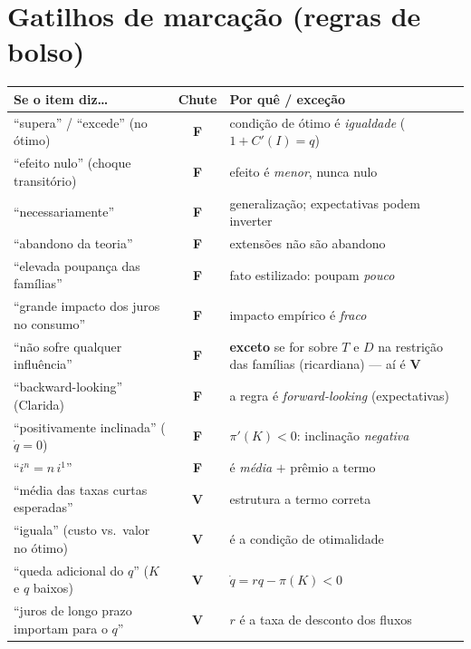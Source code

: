 \documentclass[12pt, a4paper]{article}
\newcommand{\Vok}{\textbf{\textcolor{greenbox}{V}}}
\newcommand{\Fno}{\textbf{\textcolor{redf}{F}}}
\begin{document}
\section{Gatilhos de marcação (regras de bolso)}

\begin{resultbox}[title={Palavra no item $\Rightarrow$ chute educado (e a exceção)}]
\renewcommand{\arraystretch}{1.25}
\begin{tabular}{p{4.6cm} c p{8.6cm}}
\toprule
\textbf{Se o item diz\ldots} & \textbf{Chute} & \textbf{Por quê / exceção} \\
\midrule
``supera'' / ``excede'' (no ótimo) & \Fno & condição de ótimo é
\emph{igualdade} ($1{+}C'(I){=}q$) \\
``efeito nulo'' (choque transitório) & \Fno & efeito é \emph{menor}, nunca
nulo \\
``necessariamente'' & \Fno & generalização; expectativas podem inverter \\
``abandono da teoria'' & \Fno & extensões não são abandono \\
``elevada poupança das famílias'' & \Fno & fato estilizado: poupam
\emph{pouco} \\
``grande impacto dos juros no consumo'' & \Fno & impacto empírico é
\emph{fraco} \\
``não sofre qualquer influência'' & \Fno & \textbf{exceto} se for sobre $T$ e
$D$ na restrição das famílias (ricardiana) --- aí é \Vok \\
``backward-looking'' (Clarida) & \Fno & a regra é \emph{forward-looking}
(expectativas) \\
``positivamente inclinada'' ($\dot q=0$) & \Fno & $\pi'(K)<0$: inclinação
\emph{negativa} \\
``$i^n = n\,i^1$'' & \Fno & é \emph{média} $+$ prêmio a termo \\
``média das taxas curtas esperadas'' & \Vok & estrutura a termo correta \\
``iguala'' (custo vs.\ valor no ótimo) & \Vok & é a condição de otimalidade \\
``queda adicional do $q$'' ($K$ e $q$ baixos) & \Vok & $\dot q = rq -
\pi(K) < 0$ \\
``juros de longo prazo importam para o $q$'' & \Vok & $r$ é a taxa de
desconto dos fluxos \\
\bottomrule
\end{tabular}
\end{resultbox}
\end{document}
